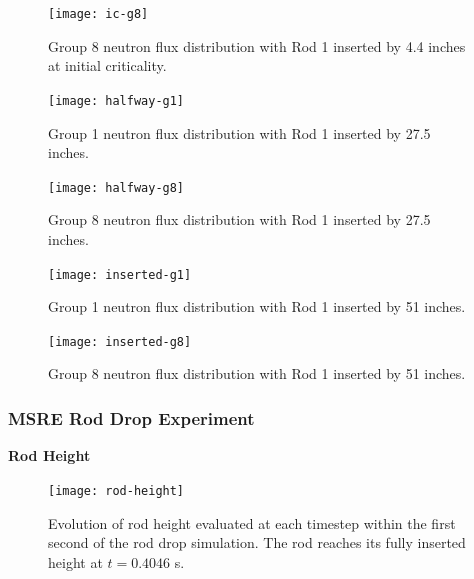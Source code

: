 \begin{frame}[noframenumbering]
  \begin{figure}[t]
    \centering
    \texttt{[image: ic-g8]}
    \caption{Group 8 neutron flux distribution with Rod 1 inserted by 4.4 inches at initial
    criticality.}
    \label{fig:ic-g8}
  \end{figure}
\end{frame}

\begin{frame}[noframenumbering]
  \begin{figure}[t]
    \centering
    \texttt{[image: halfway-g1]}
    \caption{Group 1 neutron flux distribution with Rod 1 inserted by 27.5 inches.}
    \label{fig:halfway-g1}
  \end{figure}
\end{frame}
  
\begin{frame}[noframenumbering]
  \begin{figure}[t]
    \centering
    \texttt{[image: halfway-g8]}
    \caption{Group 8 neutron flux distribution with Rod 1 inserted by 27.5 inches.}
    \label{fig:halfway-g8}
  \end{figure}
\end{frame}

\begin{frame}[noframenumbering]
  \begin{figure}[t]
    \centering
    \texttt{[image: inserted-g1]}
    \caption{Group 1 neutron flux distribution with Rod 1 inserted by 51 inches.}
    \label{fig:inserted-g1}
  \end{figure}
\end{frame}
  
\begin{frame}[noframenumbering]
  \begin{figure}[t]
    \centering
    \texttt{[image: inserted-g8]}
    \caption{Group 8 neutron flux distribution with Rod 1 inserted by 51 inches.}
    \label{fig:inserted-g8}
  \end{figure}
\end{frame}

\begin{frame}[noframenumbering]
  \frametitle{MSRE Rod Drop Experiment}
  \textbf{Rod Height}
  \begin{figure}[htb!]
    \centering
    \texttt{[image: rod-height]}
    \caption{Evolution of rod height evaluated at each timestep within the first second of the rod
    drop simulation. The rod reaches its fully inserted height at $t=0.4046$ s.}
    \label{fig:rod-height}
  \end{figure}
\end{frame}

